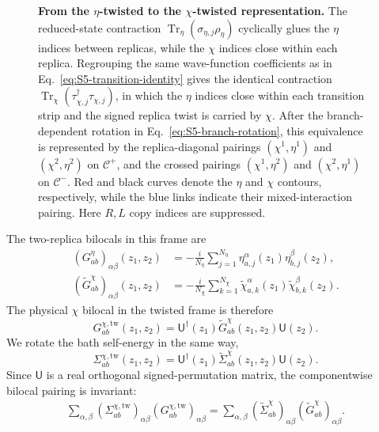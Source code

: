 \documentclass[11pt,a4paper]{article}
\begin{document}
\begin{figure}
\begin{tikzpicture}[x=0.75pt,y=0.75pt,yscale=-1,xscale=1]
\end{tikzpicture}
    \caption{\textbf{From the \(\eta\)-twisted to the \(\chi\)-twisted
representation.}
The reduced-state contraction
\(\operatorname{Tr}_{\eta}(\sigma_{\eta,j}\rho_\eta)\) cyclically glues the
\(\eta\) indices between replicas, while the \(\chi\) indices close within
each replica. Regrouping the same wave-function coefficients as in
Eq.~\eqref{eq:S5-transition-identity} gives the identical contraction
\(\operatorname{Tr}_{\chi}
(\tau_{\chi,j}^{\dagger}\tau_{\chi,j})\), in which the \(\eta\) indices close
within each transition strip and the signed replica twist is carried by
\(\chi\). After the branch-dependent rotation in
Eq.~\eqref{eq:S5-branch-rotation}, this equivalence is represented by the
replica-diagonal pairings
\((\chi^{1},\eta^{1})\) and \((\chi^{2},\eta^{2})\) on
\(\mathcal C^{+}\), and the crossed pairings
\((\chi^{1},\eta^{2})\) and \((\chi^{2},\eta^{1})\) on
\(\mathcal C^{-}\). Red and black curves denote the \(\eta\) and \(\chi\)
contours, respectively, while the blue links indicate their mixed-interaction
pairing. Here \(R,L\) copy indices are suppressed.}
\label{fig:S5-eta-chi-twist}
\end{figure}

The two-replica bilocals in this frame are
\begin{equation}
\begin{aligned}
  (G^\eta_{ab})_{\alpha\beta}(z_1,z_2)
  &=
  -\frac{i}{N_\eta}
  \sum_{j=1}^{N_\eta}
  \eta^\alpha_{a,j}(z_1)
  \eta^\beta_{b,j}(z_2),
  \\
  (\widetilde G^\chi_{ab})_{\alpha\beta}(z_1,z_2)
  &=
  -\frac{i}{N_\chi}
  \sum_{k=1}^{N_\chi}
  \widetilde\chi^\alpha_{a,k}(z_1)
  \widetilde\chi^\beta_{b,k}(z_2).
\end{aligned}
\label{eq:S5-two-replica-bilocals}
\end{equation}
The physical \(\chi\) bilocal in the twisted frame is therefore
\begin{equation}
  G^{\chi,\mathrm{tw}}_{ab}(z_1,z_2)
  =
  \mathsf U^\dagger(z_1)
  \widetilde G^\chi_{ab}(z_1,z_2)
  \mathsf U(z_2).
\label{eq:S5-twisted-bath-bilocal}
\end{equation}
We rotate the bath self-energy in the same way,
\begin{equation}
  \Sigma^{\chi,\mathrm{tw}}_{ab}(z_1,z_2)
  =
  \mathsf U^\dagger(z_1)
  \widetilde\Sigma^\chi_{ab}(z_1,z_2)
  \mathsf U(z_2).
\label{eq:S5-twisted-bath-self-energy}
\end{equation}
Since \(\mathsf U\) is a real orthogonal signed-permutation matrix, the
componentwise bilocal pairing is invariant:
\begin{equation}
\begin{aligned}
  \sum_{\alpha,\beta}
  (\Sigma^{\chi,\mathrm{tw}}_{ab})_{\alpha\beta}
  (G^{\chi,\mathrm{tw}}_{ab})_{\alpha\beta}
  =
  \sum_{\alpha,\beta}
  (\widetilde\Sigma^\chi_{ab})_{\alpha\beta}
  (\widetilde G^\chi_{ab})_{\alpha\beta}.
\end{aligned}
\label{eq:S5-SigmaG-invariance}
\end{equation}
\end{document}
